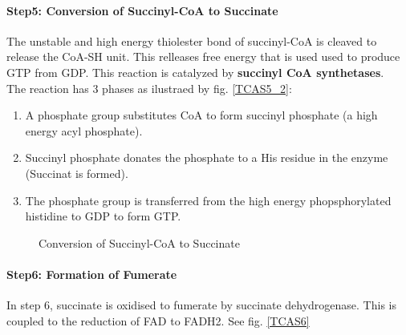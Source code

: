 \documentclass[../main.tex]{subfiles}
\begin{document}
\paragraph{Step5: Conversion of Succinyl-CoA to Succinate}
The unstable and high energy thiolester bond of succinyl-CoA is cleaved to release the CoA-SH unit. This relleases free energy that is used used to produce GTP from GDP. This reaction is catalyzed by \textbf{succinyl CoA synthetases}. \\
The reaction has 3 phases as ilustraed by fig. \ref{TCAS5_2}:
\begin{enumerate}
	\item A phosphate group substitutes CoA to form succinyl phosphate (a high energy acyl phosphate).
	\item Succinyl phosphate  donates the phosphate to a His residue in the enzyme (Succinat is formed).
	\item The phosphate group is transferred from the high energy phopsphorylated histidine to GDP to form GTP. 
\end{enumerate}
\begin{figure}[H]
	\centering
	\caption{Conversion of Succinyl-CoA to Succinate}
\end{figure}

\paragraph{Step6: Formation of Fumerate}
In step 6, succinate is oxidised to fumerate by succinate dehydrogenase. This is coupled to the reduction of FAD to FADH2. See fig. \ref{TCAS6}
\end{document}
